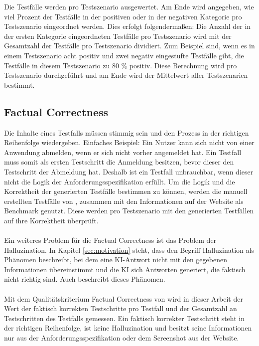 \documentclass[12pt,toc=bib,toc=listof]{scrreprt}
\begin{document}
\noindent Die Testfälle werden pro Testszenario ausgewertet. Am Ende wird angegeben, wie viel Prozent der Testfälle in der positiven oder in der negativen Kategorie pro Testszenario eingeordnet werden. Dies erfolgt folgendermaßen: Die Anzahl der in der ersten Kategorie eingeordneten Testfälle pro Testszenario wird mit der Gesamtzahl der Testfälle pro Testszenario dividiert. Zum Beispiel sind, wenn es in einem Testszenario acht positiv und zwei negativ eingestufte Testfälle gibt, die Testfälle in diesem Testszenario zu 80 \% positiv. Diese Berechnung wird pro Testszenario durchgeführt und am Ende wird der Mittelwert aller Testszenarien bestimmt.

\subsection{Factual Correctness} %
\label{sec:factualCorrectness}
Die Inhalte eines Testfalls müssen stimmig sein und den Prozess in der richtigen Reihenfolge wiedergeben. Einfaches Beispiel: Ein Nutzer kann sich nicht von einer Anwendung abmelden, wenn er sich nicht vorher angemeldet hat. Ein Testfall muss somit als ersten Testschritt die \glqq Anmeldung\grqq{} besitzen, bevor dieser den Testschritt der \glqq Abmeldung\grqq{} hat. Deshalb ist ein Testfall unbrauchbar, wenn dieser nicht die Logik der Anforderungsspezifikation erfüllt. Um die Logik und die Korrektheit der generierten Testfälle bestimmen zu können, werden die manuell erstellten Testfälle von \textcite{Pavankumar21github2022}, zusammen mit den Informationen auf der \textcite{OpenCart2025} Website als Benchmark genutzt. Diese werden pro Testszenario mit den generierten Testfällen auf ihre Korrektheit überprüft.\\
\\
Ein weiteres Problem für die \glqq Factual Correctness\grqq{} ist das Problem der Halluzination. In Kapitel \ref{sec:motivation} steht, dass \textcite{Siebert2024} den Begriff Halluzination als Phänomen beschreibt, bei dem eine KI-Antwort nicht mit den gegebenen Informationen übereinstimmt und die KI sich Antworten generiert, die faktisch nicht richtig sind. Auch \textcite{Li2024} beschreibt dieses Phänomen.\\
\\
Mit dem Qualitätskriterium \glqq Factual Correctness\grqq{} von \textcite{Ragas2025} wird in dieser Arbeit der Wert der faktisch korrekten Testschritte pro Testfall und der Gesamtzahl an Testschritten des Testfalls gemessen. Ein faktisch korrekter Testschritt steht in der richtigen Reihenfolge, ist keine Halluzination und besitzt seine Informationen nur aus der Anforderungsspezifikation oder dem Screenshot aus der Website.\\
\newpage
\end{document}
